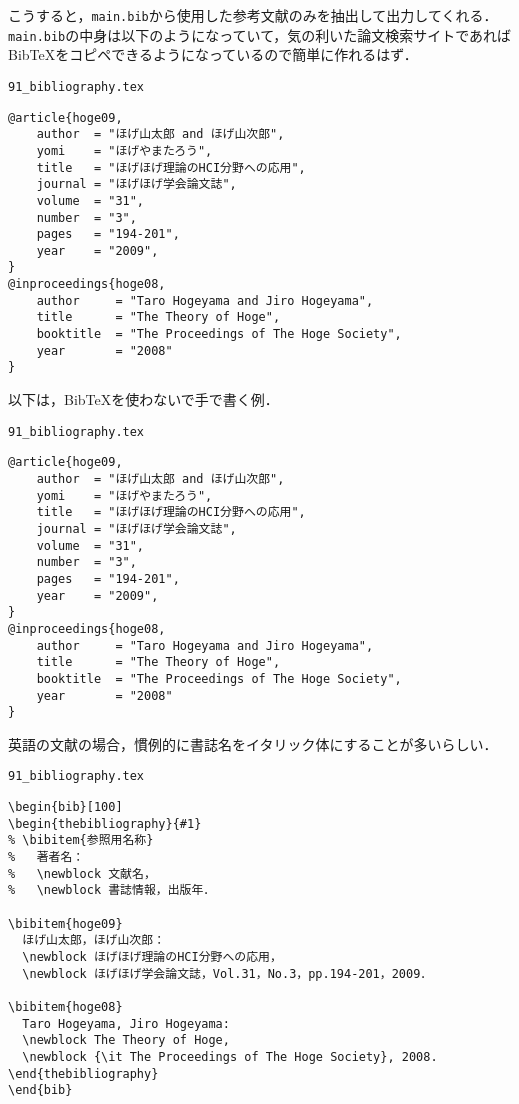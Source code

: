 こうすると，\verb|main.bib|から使用した参考文献のみを抽出して出力してくれる．\verb|main.bib|の中身は以下のようになっていて，気の利いた論文検索サイトであればBibTeXをコピペできるようになっているので簡単に作れるはず．


\begin{itembox}[l]{\texttt{91\_bibliography.tex}}
\begin{verbatim}
@article{hoge09,
    author  = "ほげ山太郎 and ほげ山次郎",
    yomi    = "ほげやまたろう",
    title   = "ほげほげ理論のHCI分野への応用",
    journal = "ほげほげ学会論文誌",
    volume  = "31",
    number  = "3",
    pages   = "194-201",
    year    = "2009",
}
@inproceedings{hoge08,
    author     = "Taro Hogeyama and Jiro Hogeyama",
    title      = "The Theory of Hoge",
    booktitle  = "The Proceedings of The Hoge Society",
    year       = "2008"
}
\end{verbatim}
\end{itembox}


以下は，BibTeXを使わないで手で書く例．

\begin{itembox}[l]{\texttt{91\_bibliography.tex}}
\begin{verbatim}
@article{hoge09,
    author  = "ほげ山太郎 and ほげ山次郎",
    yomi    = "ほげやまたろう",
    title   = "ほげほげ理論のHCI分野への応用",
    journal = "ほげほげ学会論文誌",
    volume  = "31",
    number  = "3",
    pages   = "194-201",
    year    = "2009",
}
@inproceedings{hoge08,
    author     = "Taro Hogeyama and Jiro Hogeyama",
    title      = "The Theory of Hoge",
    booktitle  = "The Proceedings of The Hoge Society",
    year       = "2008"
}
\end{verbatim}
\end{itembox}


英語の文献の場合，慣例的に書誌名をイタリック体にすることが多いらしい．

\begin{itembox}[l]{\texttt{91\_bibliography.tex}}
\begin{verbatim}
\begin{bib}[100]
\begin{thebibliography}{#1}
% \bibitem{参照用名称}
%   著者名： 
%   \newblock 文献名，
%   \newblock 書誌情報，出版年．

\bibitem{hoge09}
  ほげ山太郎，ほげ山次郎：
  \newblock ほげほげ理論のHCI分野への応用，
  \newblock ほげほげ学会論文誌，Vol.31，No.3，pp.194-201，2009．

\bibitem{hoge08}
  Taro Hogeyama, Jiro Hogeyama:
  \newblock The Theory of Hoge,
  \newblock {\it The Proceedings of The Hoge Society}, 2008.
\end{thebibliography}
\end{bib}
\end{verbatim}
\end{itembox}

